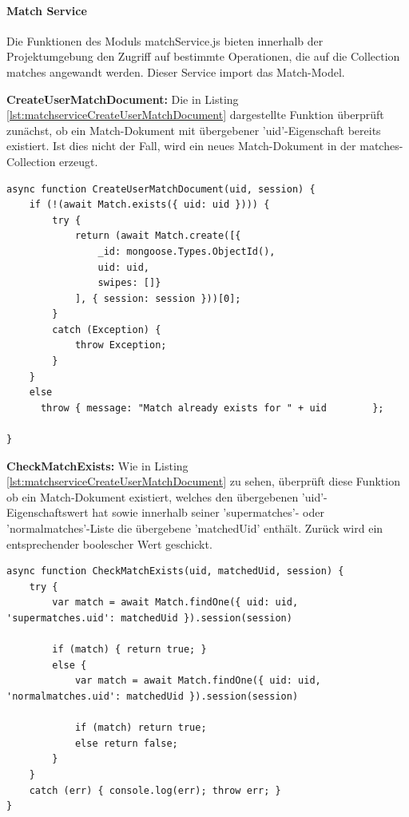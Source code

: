 \paragraph{Match Service}
Die Funktionen des Moduls matchService.js bieten innerhalb der Projektumgebung den Zugriff auf bestimmte Operationen, die auf die Collection matches angewandt werden. Dieser Service import das Match-Model.

\noindent
\textbf{CreateUserMatchDocument:}
Die in Listing \ref{lst:matchserviceCreateUserMatchDocument} dargestellte Funktion überprüft zunächst, ob ein Match-Dokument mit übergebener 'uid'-Eigenschaft bereits existiert. Ist dies nicht der Fall, wird ein neues Match-Dokument in der matches-Collection erzeugt.\\

\begin{lstlisting}[caption=Match Service - CreateUserMatchDocument, label=lst:matchserviceCreateUserMatchDocument]
async function CreateUserMatchDocument(uid, session) {
    if (!(await Match.exists({ uid: uid }))) {
        try {
            return (await Match.create([{
                _id: mongoose.Types.ObjectId(),
                uid: uid,
                swipes: []}
            ], { session: session }))[0];
        }
        catch (Exception) {
            throw Exception;
        }
    }
    else 
      throw { message: "Match already exists for " + uid 		};
    
}
\end{lstlisting}

\noindent
\textbf{CheckMatchExists:}
Wie in Listing \ref{lst:matchserviceCreateUserMatchDocument} zu sehen, überprüft diese  Funktion ob ein Match-Dokument existiert, welches den übergebenen 'uid'-Eigenschaftswert hat sowie innerhalb seiner 'supermatches'- oder 'normalmatches'-Liste die übergebene 'matchedUid' enthält. Zurück wird ein entsprechender boolescher Wert geschickt. \\

\begin{lstlisting}[caption=Match Service - CreateUserMatchDocument, label=lst:matchserviceCreateUserMatchDocument]
async function CheckMatchExists(uid, matchedUid, session) {
    try {
        var match = await Match.findOne({ uid: uid, 'supermatches.uid': matchedUid }).session(session)

        if (match) { return true; }
        else {
            var match = await Match.findOne({ uid: uid, 'normalmatches.uid': matchedUid }).session(session)

            if (match) return true;
            else return false;
        }
    }
    catch (err) { console.log(err); throw err; }
}
\end{lstlisting}

